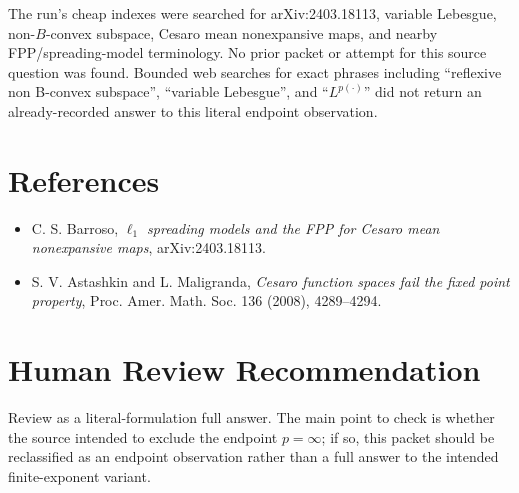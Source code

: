 \documentclass[11pt]{article}
\begin{document}
The run's cheap indexes were searched for arXiv:2403.18113, variable
Lebesgue, non-\(B\)-convex subspace, Cesaro mean nonexpansive maps, and nearby
FPP/spreading-model terminology.  No prior packet or attempt for this source
question was found.  Bounded web searches for exact phrases including
``reflexive non B-convex subspace'', ``variable Lebesgue'', and
``\(L^{p(\cdot)}\)'' did not return an already-recorded answer to this literal
endpoint observation.

\section{References}

\begin{itemize}[leftmargin=*]
\item C. S. Barroso, \emph{\(\ell_1\) spreading models and the FPP for Cesaro
mean nonexpansive maps}, arXiv:2403.18113.
\item S. V. Astashkin and L. Maligranda, \emph{Cesaro function spaces fail the
fixed point property}, Proc. Amer. Math. Soc. 136 (2008), 4289--4294.
\end{itemize}

\section{Human Review Recommendation}

Review as a literal-formulation full answer.  The main point to check is
whether the source intended to exclude the endpoint \(p=\infty\); if so, this
packet should be reclassified as an endpoint observation rather than a full
answer to the intended finite-exponent variant.
\end{document}
